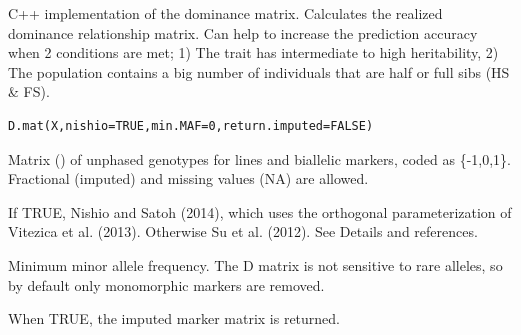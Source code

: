 \documentclass[a4paper]{book}
\begin{document}
%
\begin{Description}\relax
C++ implementation of the dominance matrix. Calculates the realized dominance relationship matrix. Can help to increase the prediction accuracy when 2 conditions are met; 1) The trait has intermediate to high heritability, 2) The population contains a big number of individuals that are half or full sibs (HS \& FS).
\end{Description}
%
\begin{Usage}
\begin{verbatim}
D.mat(X,nishio=TRUE,min.MAF=0,return.imputed=FALSE)
\end{verbatim}
\end{Usage}
%
\begin{Arguments}
\begin{ldescription}
\item[\code{X}] 
Matrix () of unphased genotypes for  lines and  biallelic markers, 
coded as \{-1,0,1\}. Fractional (imputed) and missing values (NA) are allowed.

\item[\code{nishio}] 
If TRUE, Nishio and Satoh (2014), which uses the orthogonal parameterization of Vitezica et al. (2013). Otherwise Su et al. (2012). See Details and references.

\item[\code{min.MAF}] 
Minimum minor allele frequency. The D matrix is not sensitive to rare alleles, so by default only monomorphic markers are removed.

\item[\code{return.imputed}] 
When TRUE, the imputed marker matrix is returned.  



\end{ldescription}
\end{Arguments}
%
\end{document}
